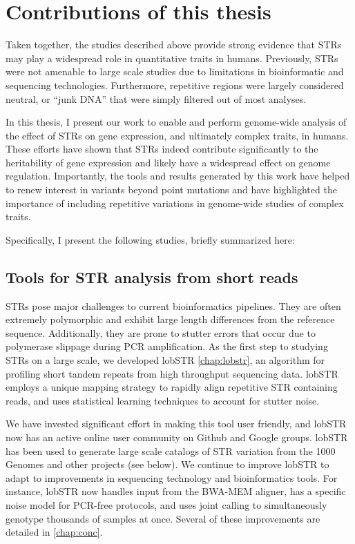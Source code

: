 \section{Contributions of this thesis}
Taken together, the studies described above provide strong evidence that STRs may play a widespread role in quantitative traits in humans. Previously, STRs were not amenable to large scale studies due to limitations in bioinformatic and sequencing technologies. Furthermore, repetitive regions were largely considered neutral, or ``junk DNA'' that were simply filtered out of most analyses.

In this thesis, I present our work to enable and perform genome-wide analysis of the effect of STRs on gene expression, and ultimately complex traits, in humans. These efforts have shown that STRs indeed contribute significantly to the heritability of gene expression and likely have a widespread effect on genome regulation. Importantly, the tools and results generated by this work have helped to renew interest in variants beyond point mutations and have highlighted the importance of including repetitive variations in genome-wide studies of complex traits. 

Specifically, I present the following studies, briefly summarized here:

\subsection{Tools for STR analysis from short reads}
STRs pose major challenges to current bioinformatics pipelines. They are often extremely polymorphic and exhibit large length differences from the reference sequence. Additionally, they are prone to stutter errors that occur due to polymerase slippage during PCR amplification. As the first step to studying STRs on a large scale, we developed lobSTR \cite{GymrekGolanRossetEtAl2012} \autoref{chap:lobstr}, an algorithm for profiling short tandem repeats from high throughput sequencing data. lobSTR employs a unique mapping strategy to rapidly align repetitive STR containing reads, and uses statistical learning techniques to account for stutter noise.

We have invested significant effort in making this tool user friendly, and lobSTR now has an active online user community on Github and Google groups. lobSTR has been used to generate large scale catalogs of STR variation from the 1000 Genomes and other projects (see below). We continue to improve lobSTR to adapt to improvements in sequencing technology and bioinformatics tools. For instance, lobSTR now handles input from the BWA-MEM aligner, has a specific noise model for PCR-free protocols, and uses joint calling to simultaneously genotype thousands of samples at once. Several of these improvements are detailed in \autoref{chap:conc}.


